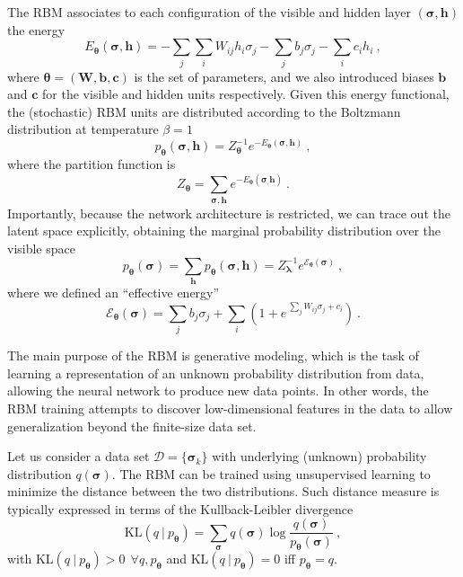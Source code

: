 \documentclass[twocolumn,english,reprint,superscriptaddress,longbibliography,pra]{revtex4-1}
\begin{document}
The RBM associates to each configuration of the visible and hidden layer $(\bm \sigma,\bm h)$ the energy
\begin{equation}
E_{\bm{\theta}}(\bm{\sigma},\bm{h})=-\sum_{j}\sum_{i}W_{ij}h_i\sigma_j-\sum_{j}b_j\sigma_j-\sum_{i}c_ih_i\:,
\end{equation}
where $\bm\theta=(\bm{W},\bm{b},\bm{c})$ is the set of parameters, and we also introduced biases $\bm b$ and $\bm c$ for the visible and hidden units respectively. Given this energy functional, the (stochastic) RBM units are distributed according to the Boltzmann distribution at temperature $\beta=1$
\begin{equation}
p_{\bm{\theta}}(\bm{\sigma},\bm{h})=Z_{\bm{\theta}}^{-1}e^{-E_{\bm{\theta}}(\bm{\sigma},\bm{h})}\:,
\end{equation}
where the partition function is
\begin{equation}
Z_{\bm{\theta}}=\sum_{\bm{\sigma},\bm{h}}e^{-E_{\bm{\theta}}(\bm{\sigma}_,\bm{h})}\:.
\end{equation}
Importantly, because the network architecture is restricted, we can trace out the latent space explicitly, obtaining the marginal probability distribution over the visible space
\begin{equation}
p_{\bm{\theta}}(\bm{\sigma})=\sum_{\bm{h}}p_{\bm{\theta}}(\bm{\sigma},\bm{h}) = Z^{-1}_{\bm{\lambda}}e^{\mathcal{E}_{\bm\theta}(\bm\sigma)}\:,
\label{Eq::RBM}
\end{equation}
where we defined an ``effective energy''
\begin{equation}
\mathcal{E}_{\bm\theta}(\bm\sigma)=\sum_jb_j\sigma_j+\sum_{i}\left(1+e^{\:\sum_{j}W_{ij}\sigma_j+c_i}\right)\:.
\end{equation}

The main purpose of the RBM is generative modeling, which is the task of learning a representation of an unknown probability distribution from data, allowing the neural network to produce new data points. In other words, the RBM training attempts to discover low-dimensional features in the data to allow generalization beyond the finite-size data set. 

Let us consider a data set $\mathcal{D}=\{\bm{\sigma}_k\}$ with underlying (unknown) probability distribution $q(\bm \sigma)$. The RBM can be trained using unsupervised learning to minimize the distance between the two distributions. Such distance measure is typically expressed in terms of the Kullback-Leibler divergence~\cite{Kullback:1951aa}
\begin{equation}
\text{KL}(q\:|\:p_{\bm{\theta}}) = \sum_{\bm{\sigma}}q(\bm{\sigma})\log\frac{q(\bm{\sigma})}{p_{\bm{\theta}}(\bm{\sigma})}\:,
\end{equation}
with $\text{KL}(q\:|\:p_{\bm{\theta}})>0\:\:\forall q,p_{\bm{\theta}}$ and $\text{KL}(q\:|\:p_{\bm{\theta}})=0$ iff $p_{\bm{\theta}}=q$. 
\end{document}
